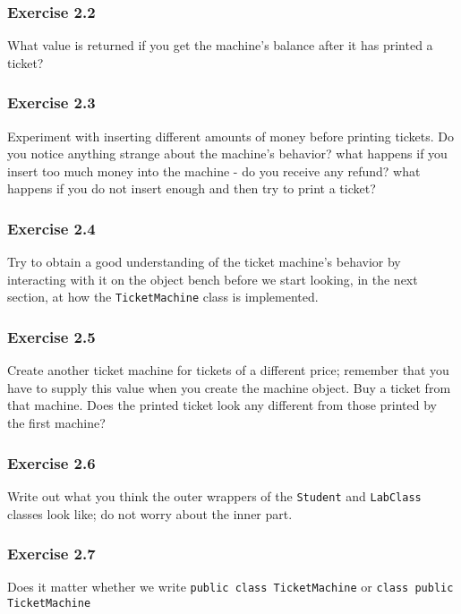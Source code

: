 \subsubsection{Exercise 2.2}
What value is returned if you get the machine's balance after it has printed a 
ticket? 

\subsubsection{Exercise 2.3}
Experiment with inserting different amounts of money before printing tickets. 
Do you notice anything strange about the machine's behavior? what happens if 
you insert too much money into the machine - do you receive any refund? what 
happens if you do not insert enough and then try to print a ticket? 

\subsubsection{Exercise 2.4}
Try to obtain a good understanding of the ticket machine's behavior by 
interacting with it on the object bench before we start looking, in the next 
section, at how the \verb?TicketMachine? class is implemented. 

\subsubsection{Exercise 2.5}
Create another ticket machine for tickets of a different price; remember that 
you have to supply this value when you create the machine object. Buy a ticket 
from that machine. Does the printed ticket look any different from those 
printed by the first machine? 

\subsubsection{Exercise 2.6}
Write out what you think the outer wrappers of the \verb?Student? and 
\verb?LabClass? classes look like; do not worry about the inner part. 

\subsubsection{Exercise 2.7}
Does it matter whether we write \verb?public class TicketMachine? or 
\verb?class public TicketMachine?